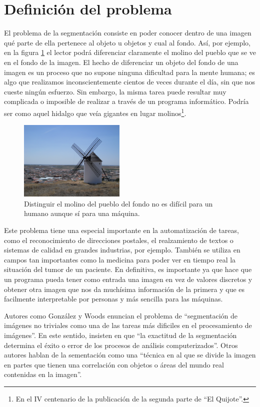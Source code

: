 \documentclass[main]{subfiles}
\begin{document}
\section{Definición del problema}\label{sec:definicion}
El problema de la segmentación consiste en poder conocer dentro de una imagen qué parte de ella pertenece al objeto u objetos y cual al fondo. Así, por ejemplo, en la figura \ref{img:ejemplomolino} el lector podrá diferenciar claramente el molino del pueblo que se ve en el fondo de la imagen. El hecho de diferenciar un objeto del fondo de una imagen es un proceso que no supone ninguna dificultad para la mente humana; es algo que realizamos inconscientemente cientos de veces durante el día, sin que nos cueste ningún esfuerzo. Sin embargo, la misma tarea puede resultar muy complicada o imposible de realizar a través de un programa informático. Podría ser como aquel hidalgo que veía gigantes en lugar molinos\footnote{En el IV centenario de la publicación de la segunda parte de ``El Quijote''.}.

\begin{figure}
	\centering
	\includegraphics[width=0.45\textwidth]{img/molino.jpg}
	\caption{Distinguir el molino del pueblo del fondo no es difícil para un humano aunque sí para una máquina.}
	\label{img:ejemplomolino}
\end{figure}

Este problema tiene una especial importante en la automatización de tareas, como el reconocimiento de direcciones postales, el realzamiento de textos o sistemas de calidad en grandes industrias, por ejemplo. También se utiliza en campos tan importantes como la medicina para poder ver en tiempo real la situación del tumor de un paciente. En definitiva, es importante ya que hace que un programa pueda tener como entrada una imagen en vez de valores discretos y obtener otra imagen que nos da muchísima información de la primera y que es facilmente interpretable por personas y más sencilla para las máquinas.

Autores como González y Woods \cite{lib:gonzalez} enuncian el problema de ``segmentación de imágenes no triviales como una de las tareas más dificiles en el procesamiento de imágenes''. En este sentido, insisten en que ``la exactitud de la segmentación determina el éxito o error de los procesos de análisis computerizados''. Otros autores \cite{lib:sonka} hablan de la sementación como una ``técnica en al que se divide la imagen en partes que tienen una correlación con objetos o áreas del mundo real contenidas en la imagen''.
\end{document}
